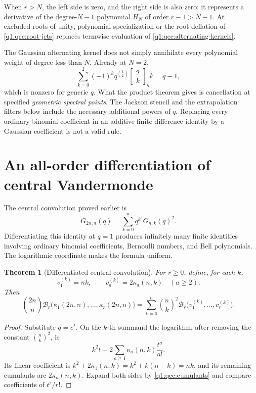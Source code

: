 \documentclass[11pt,a4paper,oneside,openany]{book}
\newtheorem{theorem}{Theorem}[chapter]
\theoremstyle{definition}
\theoremstyle{remark}
\newcommand{\GB}[3][q]{\begin{bmatrix}#2\\#3\end{bmatrix}_{#1}}
\newcommand{\Y}[1]{\mathcal B_{#1}}
\begin{document}
When \(r>N\), the left side is zero, and the right side is also zero:
it represents a derivative of the degree-\(N-1\) polynomial \(H_N\)
of order \(r-1>N-1\). At excluded roots of unity, polynomial
specialization or the root deflation of \cref{q1:qcc:root-jets} replaces
termwise evaluation of \eqref{q1:qcc:alternating-kernels}.

\begin{auditbox}[title={Which cancellation is actually present?}]
The Gaussian alternating kernel does not simply annihilate every polynomial
weight of degree less than \(N\). Already at \(N=2\),
\[
 \sum_{k=0}^{2}(-1)^kq^{\binom k2}\GB2k k=q-1,
\]
which is nonzero for generic \(q\). What the product theorem gives is
cancellation at specified \emph{geometric spectral points}. The Jackson stencil
and the extrapolation filters below include the necessary additional powers of
\(q\). Replacing every ordinary binomial coefficient in an additive
finite-difference identity by a Gaussian coefficient is not a valid rule.
\end{auditbox}

\section{An all-order differentiation of central Vandermonde}
The central convolution proved earlier is
\[
 G_{2n,n}(q)=\sum_{k=0}^{n}q^{k^2}G_{n,k}(q)^2.
\]
Differentiating this identity at \(q=1\) produces infinitely many finite
identities involving ordinary binomial coefficients, Bernoulli numbers, and
Bell polynomials. The logarithmic coordinate makes the formula uniform.

\begin{theorem}[Differentiated central convolution]
\label{q1:qcc:differentiated-central}
For \(r\ge0\), define, for each \(k\),
\[
 v_1^{(k)}=nk,\qquad
 v_a^{(k)}=2\kappa_a(n,k)\quad(a\ge2).
\]
Then
\begin{equation}\label{q1:qcc:differentiated-central-eq}
 \binom{2n}{n}\Y r\bigl(\kappa_1(2n,n),\ldots,\kappa_r(2n,n)\bigr)
 =\sum_{k=0}^{n}\binom nk^2
           \Y r\bigl(v_1^{(k)},\ldots,v_r^{(k)}\bigr).
\end{equation}
\end{theorem}
\begin{proof}
Substitute \(q=e^t\). On the \(k\)-th summand the logarithm, after
removing the constant \(\binom nk^2\), is
\[
 k^2t+2\sum_{a\ge1}\kappa_a(n,k)\frac{t^a}{a!}.
\]
Its linear coefficient is
\(k^2+2\kappa_1(n,k)=k^2+k(n-k)=nk\), and its remaining cumulants
are \(2\kappa_a(n,k)\). Expand both sides by
\cref{q1:qcc:cumulants} and compare coefficients of \(t^r/r!\).
\end{proof}
\end{document}
